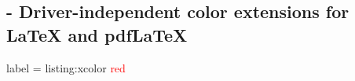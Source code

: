
\subsection{ - Driver-independent color extensions for LaTeX and pdfLaTeX}

\begin{tcblisting}{label = listing:xcolor}
  \textcolor{red}{red}
\end{tcblisting}
